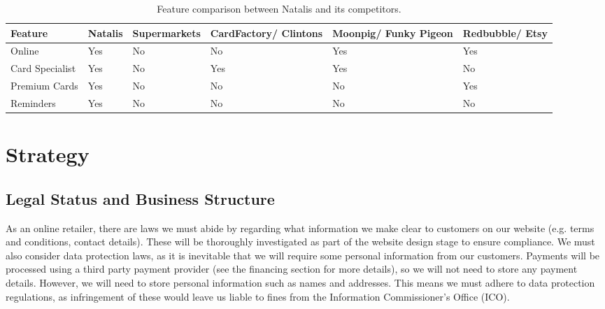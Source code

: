 \documentclass[10pt,a4paper]{article}
\begin{document}
\begin{table}[h]\footnotesize\centering
 \begin{tabular}{ | p{2cm} | p{2cm} | p{2cm} | p{2cm} | p{2cm} | p{2cm} | }
    \hline
    Feature & Natalis & Supermarkets & CardFactory/ Clintons & Moonpig/ Funky Pigeon & Redbubble/ Etsy \\
    \hline
    Online & \cellcolor{tableGreen}Yes & \cellcolor{tableRed}No & \cellcolor{tableRed}No & \cellcolor{tableGreen}Yes & \cellcolor{tableGreen}Yes \\
    Card Specialist & \cellcolor{tableGreen}Yes & \cellcolor{tableRed}No & \cellcolor{tableGreen}Yes & \cellcolor{tableGreen}Yes & \cellcolor{tableRed}No \\
    Premium Cards& \cellcolor{tableGreen}Yes & \cellcolor{tableRed}No & \cellcolor{tableRed}No & \cellcolor{tableRed}No & \cellcolor{tableGreen}Yes \\
    Reminders & \cellcolor{tableGreen}Yes	& \cellcolor{tableRed}No & \cellcolor{tableRed}No & \cellcolor{tableRed}No & \cellcolor{tableRed}No \\
    \hline
  \end{tabular}
  \caption{Feature comparison between Natalis and its competitors.}
	\label{table:competitor_analysis}
\end{table}

\section*{Strategy}
\subsection*{Legal Status and Business Structure}

As an online retailer, there are laws we must abide by regarding what information we make clear to customers on our website (e.g. terms and conditions, contact details). These will be thoroughly investigated as part of the website design stage to ensure compliance. We must also consider data protection laws, as it is inevitable that we will require some personal information from our customers. Payments will be processed using a third party payment provider (see the financing section for more details), so we will not need to store any payment details. However, we will need to store personal information such as names and addresses. This means we must adhere to data protection regulations, as infringement of these would leave us liable to fines from the Information Commissioner's Office (ICO).
\end{document}
